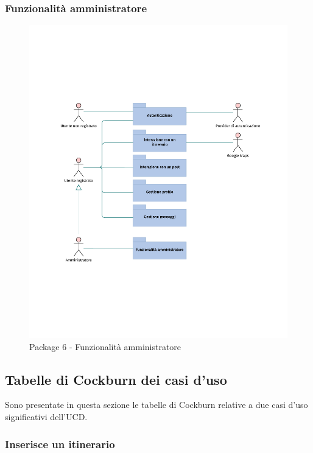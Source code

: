 \documentclass{natourDoc}
\begin{document}
\subsubsection{Funzionalità amministratore}
\begin{figure}[!htbp]
	\centering
	\includegraphics[width=\textwidth, page=7]{./diagrams/useCase.pdf}
	\caption{Package 6 - Funzionalità amministratore}
\end{figure}
\FloatBarrier

\newpage
\subsection{Tabelle di Cockburn dei casi d'uso}
Sono presentate in questa sezione le tabelle di Cockburn relative a due casi d'uso significativi dell'UCD.

\subsubsection{Inserisce un itinerario}
\end{document}
